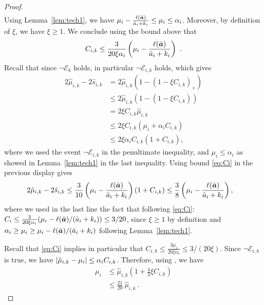 \begin{proof}
\begin{align*}
	\end{align*}
	Using Lemma~\ref{lem:tech1}, we have $\mu_i - \frac{\ell(\bar{\bm{a}})}{\bar{a}_i+k_i} \le \mu_i \le \alpha_i$. Moreover, by definition of $\xi$, we have $\xi \ge 1$. We conclude using the bound above that
	\begin{equation}\label{eq:Ci}
		C_{i,k} \le \frac{3}{20\xi \alpha_i}\left(\mu_i - \frac{\ell(\bar{\bm{a}})}{\bar{a}_i+k_i}\right)~.
	\end{equation}
	\noindent Recall that since $\neg \mathcal{E}_{k}$ holds, in particular $\neg \mathcal{E}_{i,k}$ holds, which gives
	\begin{align*}
		2\hat{\mu}_{i,k} -2\hat{s}_{i,k} &= 2\hat{\mu}_{i,k} \left(1-\left(1-\xi C_{i,k}\right)_{+}\right)\\
		&\le 2\hat{\mu}_{i,k} \left(1-\left(1-\xi C_{i,k}\right)\right)\\
		&= 2\xi C_{i,k}\hat{\mu}_{i,k}\\
		&\le 2\xi C_{i,k} (\mu_i+\alpha_i C_{i,k})\\
		&\le 2\xi \alpha_i C_{i,k} (1+ C_{i,k}),
	\end{align*}
	where we used the event $\neg \mathcal{E}_{i,k}$ in the penultimate inequality, and $\mu_i \le \alpha_i$ as showed in Lemma~\ref{lem:tech1} in the last inequality.
	Using bound \eqref{eq:Ci} in the previous display gives
	\begin{align}
		2\hat{\mu}_{i,k} -2\hat{s}_{i,k} &\le \frac{3}{10} \left(\mu_i - \frac{\ell(\bar{\bm{a}})}{\bar{a}_i+k_i}\right) (1+C_{i,k})
		\le \frac{3}{8} \left(\mu_i - \frac{\ell(\bar{\bm{a}})}{\bar{a}_i+k_i}\right), \label{eq:conf22}
	\end{align} 
	where we used in the last line the fact that following \eqref{eq:Ci}: $C_i \le \frac{3}{20\xi \alpha_i}(\mu_i - \ell(\bar{\bm{a}})/(\bar{a}_i+k_i)) \le 3/20$, since $\xi \ge 1$ by definition and $\alpha_i \ge \mu_i \ge \mu_i - \ell(\bar{\bm{a}})/(\bar{a}_i+k_i)$ following Lemma~\ref{lem:tech1}.
	
	\noindent Recall that \eqref{eq:Ci} implies in particular that $C_{i,k} \le \frac{3\mu_i}{20\xi \alpha_i} \le 3/(20\xi)$. Since $\neg \mathcal{E}_{i,k}$ is true, we have  $\left| \hat{\mu}_{i,k} - \mu_i \right| \le \alpha_i C_{i,k}$. Therefore, using , we have
	\begin{align}
		\mu_i &\le \hat{\mu}_{i,k} \left(1 + \frac{4}{3} \xi C_{i,k}\right)\label{eq:ucb0}\\
		&\le \frac{21}{20}~\hat{\mu}_{i,k}~. \label{eq:ucb}
	\end{align}
	

\end{proof}
